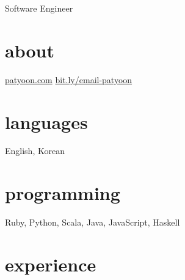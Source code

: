 \documentclass[]{patyoon-cv}
\begin{document}
{Software Engineer}

\begin{aside}
\section{about}
\href{https://patyoon.com}{patyoon.com}
\href{https://bit.ly/email-patyoon}{bit.ly/email-patyoon}
\section{languages}
English, Korean
\section{programming}
Ruby,
Python,
Scala,
Java,
JavaScript,
Haskell
\end{aside}

\section{experience}
\end{document}
